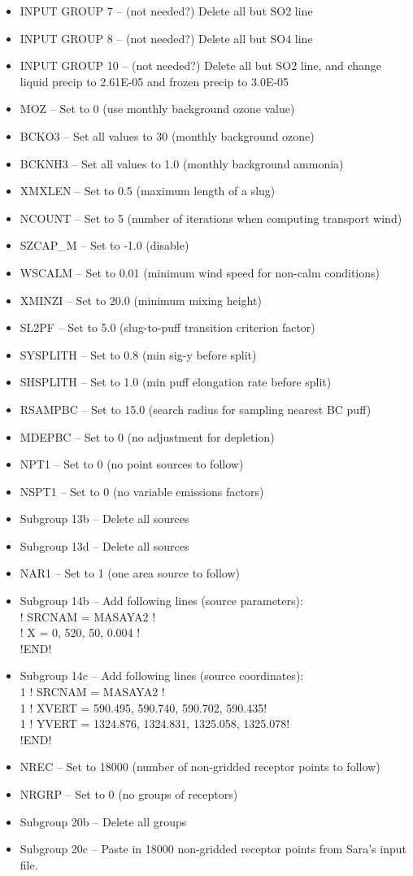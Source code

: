 \documentclass[10pt,a4paper]{article}
\newcommand\tab[1][0.5cm]{\hspace*{#1}}
\begin{document}
\begin{itemize}
\begin{itemize}
\item INPUT GROUP 7 -- (not needed?) Delete all but SO2 line
\item INPUT GROUP 8 -- (not needed?) Delete all but SO4 line
\item INPUT GROUP 10 -- (not needed?) Delete all but SO2 line, and change liquid precip to 2.61E-05 and frozen precip to 3.0E-05
\item MOZ -- Set to 0 (use monthly background ozone value)
\item BCKO3 -- Set all values to 30 (monthly background ozone)
\item BCKNH3 -- Set all values to 1.0 (monthly background ammonia)
\item XMXLEN -- Set to 0.5 (maximum length of a slug)
\item NCOUNT -- Set to 5 (number of iterations when computing transport wind)
\item SZCAP\_M -- Set to -1.0 (disable)
\item WSCALM -- Set to 0.01 (minimum wind speed for non-calm conditions)
\item XMINZI -- Set to 20.0 (minimum mixing height)
\item SL2PF -- Set to 5.0 (slug-to-puff transition criterion factor)
\item SYSPLITH -- Set to 0.8 (min sig-y before split)
\item SHSPLITH -- Set to 1.0 (min puff elongation rate before split)
\item RSAMPBC -- Set to 15.0 (search radius for sampling nearest BC puff)
\item MDEPBC -- Set to 0 (no adjustment for depletion)
\item NPT1 -- Set to 0 (no point sources to follow)
\item NSPT1 -- Set to 0 (no variable emissions factors)
\item Subgroup 13b -- Delete all sources
\item Subgroup 13d -- Delete all sources
\item NAR1 -- Set to 1 (one area source to follow)
\item Subgroup 14b -- Add following lines (source parameters):\\
\tab ! SRCNAM = MASAYA2 !\\
\tab ! X = 0, 520, 50, 0.004 !\\
\tab !END!
\item Subgroup 14c -- Add following lines (source coordinates): \\
\tab 1 ! SRCNAM = MASAYA2 !\\
\tab 1 ! XVERT = 590.495, 590.740, 590.702, 590.435!  \\
\tab 1 ! YVERT = 1324.876, 1324.831, 1325.058, 1325.078!\\
\tab !END!
\item NREC -- Set to 18000 (number of non-gridded receptor points to follow)
\item NRGRP -- Set to 0 (no groups of receptors)
\item Subgroup 20b -- Delete all groups
\item Subgroup 20c -- Paste in 18000 non-gridded receptor points from Sara's input file.


\end{itemize}
\end{itemize}
\end{document}
